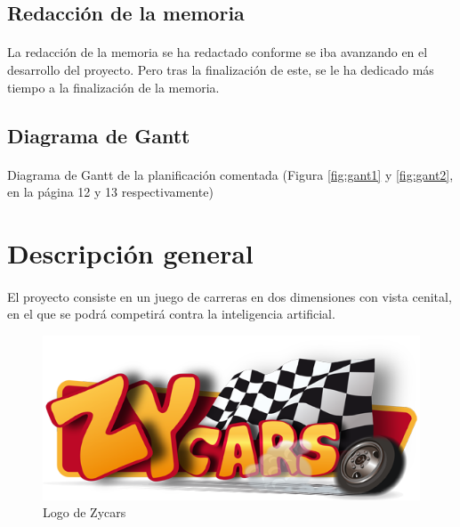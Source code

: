 \documentclass[a4paper,11pt]{article} %
\begin{document}
\subsection{Redacción de la memoria}

\paragraph{}
La redacción de la memoria se ha redactado conforme se iba avanzando en el desarrollo del proyecto. Pero tras la finalización
de este, se le ha dedicado más tiempo a la finalización de la memoria.

\subsection{Diagrama de Gantt}

\paragraph{}
Diagrama de Gantt de la planificación comentada (Figura \ref{fig:gant1} y \ref{fig:gant2}, en la página 12 y 13 respectivamente)

\section{Descripción general}

\paragraph{}
El proyecto consiste en un juego de carreras en dos dimensiones con vista cenital, en el que se podrá competirá contra la 
inteligencia artificial. 

\begin{figure}[H]
  \label{logo_zycars}
  \begin{center}
    \includegraphics[scale=0.5]{imagenes/logo_zycars.png}
  \end{center}
  \caption{Logo de Zycars}
\end{figure}
\end{document}
